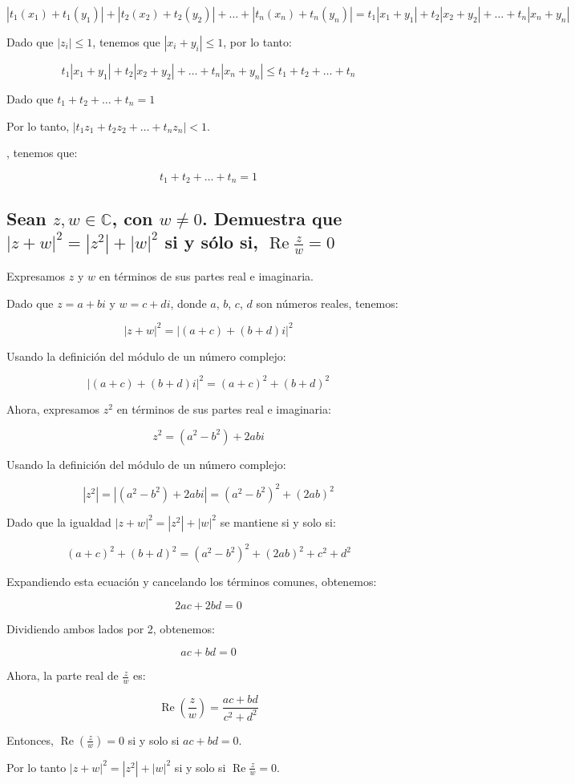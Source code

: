 \[ |t_1(x_1) + t_1(y_1)| + |t_2(x_2) + t_2(y_2)| + \dots + |t_n(x_n) + t_n(y_n)| = t_1|x_1 + y_1| + t_2|x_2 + y_2| + \dots + t_n|x_n + y_n| \]

Dado que $ |z_i| \leq 1 $, tenemos que $ |x_i + y_i| \leq 1 $, por lo tanto:

\[ t_1|x_1 + y_1| + t_2|x_2 + y_2| + \dots + t_n|x_n + y_n| \leq t_1 + t_2 + \dots + t_n \]

Dado que $ t_1 + t_2 + \dots + t_n = 1 $

Por lo tanto, $ |t_1 z_1 + t_2 z_2 + \dots + t_n z_n| < 1 $.

, tenemos que:

\[ t_1 + t_2 + \dots + t_n = 1 \]

\subsection{Sean $z,w \in \mathbb{C}$, con $w \neq 0$. Demuestra que  $|z+w|^2 =|z^2|+|w|^2$ si y sólo si, $\operatorname{Re}\frac{z}{w}=0$}

Expresamos $ z $ y $ w $ en términos de sus partes real e imaginaria.

Dado que $ z = a + bi $ y $ w = c + di $, donde $ a $, $ b $, $ c $, $ d $ son números reales, tenemos:

\[ |z+w|^2 = |(a+c) + (b+d)i|^2 \]

Usando la definición del módulo de un número complejo:

\[ |(a+c) + (b+d)i|^2 = (a+c)^2 + (b+d)^2 \]

Ahora, expresamos $ z^2 $ en términos de sus partes real e imaginaria:

\[ z^2 = (a^2 - b^2) + 2abi \]

Usando la definición del módulo de un número complejo:

\[ |z^2| = |(a^2 - b^2) + 2abi| = (a^2 - b^2)^2 + (2ab)^2 \]

Dado que la igualdad $ |z+w|^2 = |z^2|+|w|^2 $ se mantiene si y solo si:

\[ (a+c)^2 + (b+d)^2 = (a^2 - b^2)^2 + (2ab)^2 + c^2 + d^2 \]

Expandiendo esta ecuación y cancelando los términos comunes, obtenemos:

\[ 2ac + 2bd = 0 \]

Dividiendo ambos lados por 2, obtenemos:

\[ ac + bd = 0 \]

Ahora, la parte real de $ \frac{z}{w} $ es:

\[ \operatorname{Re}\left(\frac{z}{w}\right) = \frac{ac + bd}{c^2 + d^2} \]

Entonces, $ \operatorname{Re}\left(\frac{z}{w}\right) = 0 $ si y solo si $ ac + bd = 0 $.

Por lo tanto $ |z+w|^2 = |z^2|+|w|^2 $ si y solo si $ \operatorname{Re}\frac{z}{w} = 0 $.
